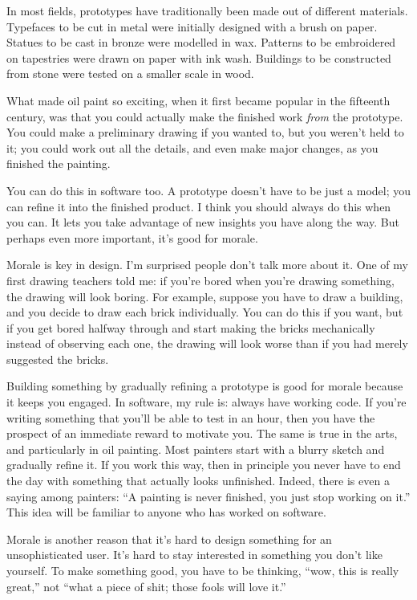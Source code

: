 In most fields, prototypes have traditionally been made out of different
materials. Typefaces to be cut in metal were initially designed with a
brush on paper. Statues to be cast in bronze were modelled in wax.
Patterns to be embroidered on tapestries were drawn on paper with ink
wash. Buildings to be constructed from stone were tested on a smaller
scale in wood.

What made oil paint so exciting, when it first became popular in the
fifteenth century, was that you could actually make the finished work
\emph{from} the prototype. You could make a preliminary drawing if you
wanted to, but you weren't held to it; you could work out all the
details, and even make major changes, as you finished the painting.

You can do this in software too. A prototype doesn't have to be just a
model; you can refine it into the finished product. I think you should
always do this when you can. It lets you take advantage of new insights
you have along the way. But perhaps even more important, it's good for
morale.

Morale is key in design. I'm surprised people don't talk more about it.
One of my first drawing teachers told me: if you're bored when you're
drawing something, the drawing will look boring. For example, suppose
you have to draw a building, and you decide to draw each brick
individually. You can do this if you want, but if you get bored halfway
through and start making the bricks mechanically instead of observing
each one, the drawing will look worse than if you had merely suggested
the bricks.

Building something by gradually refining a prototype is good for morale
because it keeps you engaged. In software, my rule is: always have
working code. If you're writing something that you'll be able to test in
an hour, then you have the prospect of an immediate reward to motivate
you. The same is true in the arts, and particularly in oil painting.
Most painters start with a blurry sketch and gradually refine it. If you
work this way, then in principle you never have to end the day with
something that actually looks unfinished. Indeed, there is even a saying
among painters: ``A painting is never finished, you just stop working on
it.'' This idea will be familiar to anyone who has worked on software.

Morale is another reason that it's hard to design something for an
unsophisticated user. It's hard to stay interested in something you
don't like yourself. To make something good, you have to be thinking,
``wow, this is really great,'' not ``what a piece of shit; those fools
will love it.''

